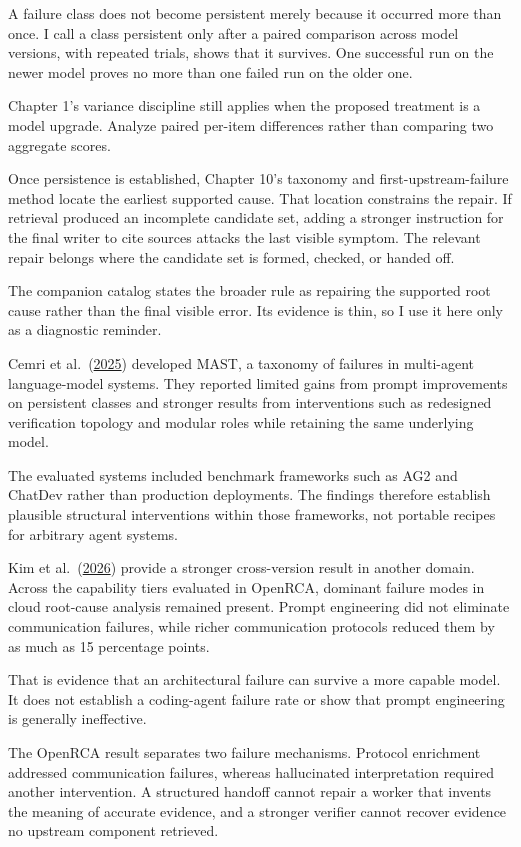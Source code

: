 A failure class does not become persistent merely because it occurred more than once. I call a class persistent only after a paired comparison across model versions, with repeated trials, shows that it survives. One successful run on the newer model proves no more than one failed run on the older one.

Chapter 1's variance discipline still applies when the proposed treatment is a model upgrade. Analyze paired per-item differences rather than comparing two aggregate scores.

Once persistence is established, Chapter 10's taxonomy and first-upstream-failure method locate the earliest supported cause. That location constrains the repair. If retrieval produced an incomplete candidate set, adding a stronger instruction for the final writer to cite sources attacks the last visible symptom. The relevant repair belongs where the candidate set is formed, checked, or handed off.

The companion catalog states the broader rule as repairing the supported root cause rather than the final visible error. Its evidence is thin, so I use it here only as a diagnostic reminder.

Cemri et al.~(\href{https://arxiv.org/abs/2503.13657}{2025}) developed MAST, a taxonomy of failures in multi-agent language-model systems. They reported limited gains from prompt improvements on persistent classes and stronger results from interventions such as redesigned verification topology and modular roles while retaining the same underlying model.

The evaluated systems included benchmark frameworks such as AG2 and ChatDev rather than production deployments. The findings therefore establish plausible structural interventions within those frameworks, not portable recipes for arbitrary agent systems.

Kim et al.~(\href{https://arxiv.org/abs/2602.09937}{2026}) provide a stronger cross-version result in another domain. Across the capability tiers evaluated in OpenRCA, dominant failure modes in cloud root-cause analysis remained present. Prompt engineering did not eliminate communication failures, while richer communication protocols reduced them by as much as 15 percentage points.

That is evidence that an architectural failure can survive a more capable model. It does not establish a coding-agent failure rate or show that prompt engineering is generally ineffective.

The OpenRCA result separates two failure mechanisms. Protocol enrichment addressed communication failures, whereas hallucinated interpretation required another intervention. A structured handoff cannot repair a worker that invents the meaning of accurate evidence, and a stronger verifier cannot recover evidence no upstream component retrieved.

